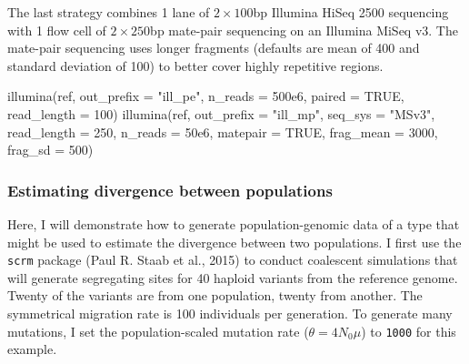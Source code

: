 \documentclass[12pt,]{article}
\newenvironment{Shaded}{}{}
\newcommand{\DataTypeTok}[1]{#1}
\newcommand{\DecValTok}[1]{#1}
\newcommand{\FloatTok}[1]{#1}
\newcommand{\KeywordTok}[1]{\textcolor[rgb]{0.00,0.00,1.00}{#1}}
\newcommand{\NormalTok}[1]{#1}
\newcommand{\OperatorTok}[1]{#1}
\newcommand{\OtherTok}[1]{\textcolor[rgb]{1.00,0.25,0.00}{#1}}
\newcommand{\StringTok}[1]{\textcolor[rgb]{0.00,0.50,0.50}{#1}}
\begin{document}
The last strategy combines 1 lane of \(2 \times 100\)bp Illumina HiSeq 2500 sequencing
with 1 flow cell of \(2 \times 250\)bp mate-pair sequencing on an Illumina MiSeq v3.
The mate-pair sequencing uses longer fragments (defaults are mean of 400 and
standard deviation of 100) to better cover highly
repetitive regions.

\begin{Shaded}
\begin{Highlighting}[]
\KeywordTok{illumina}\NormalTok{(ref, }\DataTypeTok{out_prefix =} \StringTok{"ill_pe"}\NormalTok{, }\DataTypeTok{n_reads =} \FloatTok{500e6}\NormalTok{, }\DataTypeTok{paired =} \OtherTok{TRUE}\NormalTok{,}
         \DataTypeTok{read_length =} \DecValTok{100}\NormalTok{)}
\KeywordTok{illumina}\NormalTok{(ref, }\DataTypeTok{out_prefix =} \StringTok{"ill_mp"}\NormalTok{, }\DataTypeTok{seq_sys =} \StringTok{"MSv3"}\NormalTok{,}
         \DataTypeTok{read_length =} \DecValTok{250}\NormalTok{, }\DataTypeTok{n_reads =} \FloatTok{50e6}\NormalTok{, }\DataTypeTok{matepair =} \OtherTok{TRUE}\NormalTok{, }
         \DataTypeTok{frag_mean =} \DecValTok{3000}\NormalTok{, }\DataTypeTok{frag_sd =} \DecValTok{500}\NormalTok{)}
\end{Highlighting}
\end{Shaded}

\hypertarget{estimating-divergence-between-populations}{%
\subsubsection{Estimating divergence between populations}\label{estimating-divergence-between-populations}}

Here, I will demonstrate how to generate population-genomic data of a type that might
be used to estimate the divergence between two populations.
I first use the \texttt{scrm} package (Paul R. Staab et al., 2015) to conduct
coalescent simulations that will generate segregating sites for 40 haploid variants
from the reference genome.
Twenty of the variants are from one population, twenty from another.
The symmetrical migration rate is 100 individuals per generation.
To generate many mutations, I set the population-scaled mutation rate
(\(\theta = 4 N_0 \mu\)) to \texttt{1000} for this example.

\begin{Shaded}
\end{Shaded}
\end{document}
